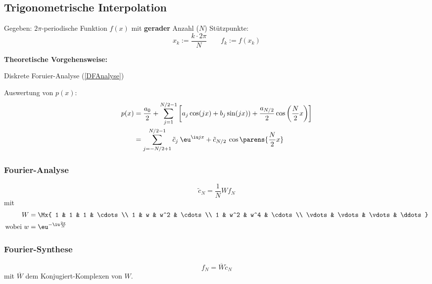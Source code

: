 	\subsection{Trigonometrische Interpolation}
		Gegeben: $2\pi$-periodische Funktion $f(x)$ mit \textbf{gerader} Anzahl ($N$) Stützpunkte:
		\[
			x_k:=\frac{k\cdot 2\pi}{N} \qquad f_k:= f(x_k)
		\]

		\textbf{Theoretische Vorgehensweise:}
		\begin{tightenumerate}
			\item Diskrete Foruier-Analyse (\ref{DFAnalyse})
			\item Auswertung von $p(x)$:
				\begin{align*}
					p(x) &= \frac{a_0}{2} + \sum_{j=1}^{N/2-1}\left[a_j\cos(jx) + b_j \sin(jx)) + \frac{a_{N/2}}{2}\cos\left(\frac{N}{2}x\right) \right] \\
					     &= \sum_{j=-N/2+1}^{N/2-1} \tilde c_j \: \eu^{\iu j x} + \tilde c_{N/2} \: \cos \parens{\frac N 2 x}
				\end{align*}
		\end{tightenumerate}

		\subsubsection{Fourier-Analyse}
			\begin{equation}
				\tilde c_N = \frac{1}{N}Wf_N \label{DFAnalyse}
			\end{equation}
			mit
			\begin{align*}
				W &= \Mx{
					1 & 1 & 1 & \cdots \\
					1 & w & w^2 & \cdots \\
					1 & w^2 & w^4 & \cdots \\
					\vdots & \vdots & \vdots & \ddots
				} \\
				\text{wobei } w &= \eu^{-\iu \frac{2\pi}{N}}
			\end{align*}

		\subsubsection{Fourier-Synthese}
			\[
				f_N = \overline{W}\tilde c_N
			\]
			mit $\overline{W}$ dem Konjugiert-Komplexen von $W$.

